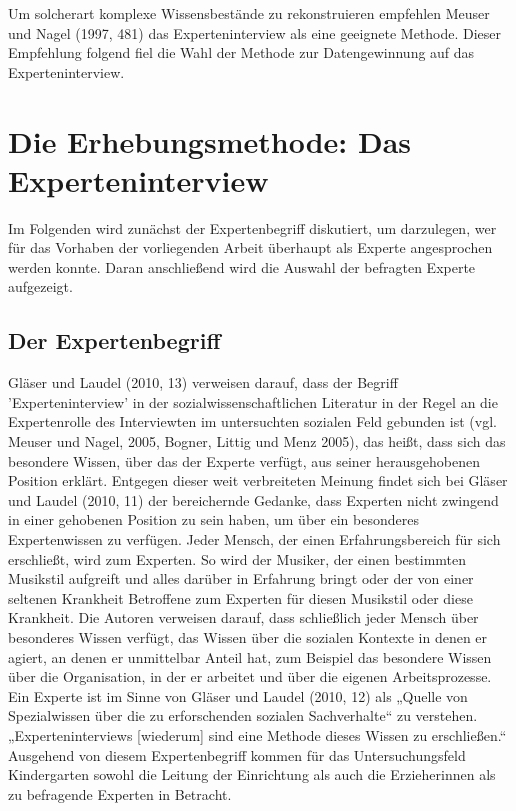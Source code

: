 Um solcherart komplexe Wissensbestände zu rekonstruieren empfehlen Meuser und Nagel (1997, 481) das Experteninterview als eine geeignete Methode. Dieser Empfehlung folgend fiel die Wahl der Methode zur Datengewinnung auf das Experteninterview. 


\section{Die Erhebungsmethode: Das Experteninterview}
Im Folgenden wird zunächst der Expertenbegriff diskutiert, um darzulegen, wer für das Vorhaben der vorliegenden Arbeit überhaupt als Experte angesprochen werden konnte.
Daran anschließend wird die Auswahl der befragten Experte aufgezeigt. 

\subsection{Der Expertenbegriff}
Gläser und Laudel (2010, 13) verweisen darauf, dass der Begriff ’Experteninterview’ in der sozialwissenschaftlichen Literatur in der Regel an die Expertenrolle des Interviewten im untersuchten sozialen Feld gebunden ist (vgl. Meuser und Nagel, 2005, Bogner, Littig und Menz 2005), das heißt, dass sich das besondere Wissen, über das der Experte verfügt, aus seiner herausgehobenen Position erklärt. Entgegen dieser weit verbreiteten Meinung findet sich bei Gläser und Laudel (2010, 11) der bereichernde Gedanke, dass Experten nicht zwingend in einer gehobenen Position zu sein haben, um über ein besonderes Expertenwissen zu verfügen. Jeder Mensch, der einen Erfahrungsbereich für sich erschließt, wird zum Experten. So wird der Musiker, der einen bestimmten Musikstil aufgreift und alles darüber in Erfahrung bringt oder der von einer seltenen Krankheit Betroffene zum Experten für diesen Musikstil oder diese Krankheit. Die Autoren verweisen darauf, dass schließlich jeder Mensch über besonderes Wissen verfügt, das Wissen über die sozialen Kontexte in denen er agiert, an denen er unmittelbar Anteil hat, zum Beispiel das besondere Wissen über die Organisation, in der er arbeitet und über die eigenen Arbeitsprozesse. Ein Experte ist im Sinne von Gläser und Laudel (2010, 12) als „Quelle von Spezialwissen über die zu erforschenden sozialen Sachverhalte“ zu verstehen. „Experteninterviews [wiederum] sind eine Methode dieses Wissen zu erschließen.“ Ausgehend von diesem Expertenbegriff kommen für das Untersuchungsfeld Kindergarten sowohl die Leitung der Einrichtung als auch die Erzieherinnen als zu befragende Experten in Betracht. 
 
